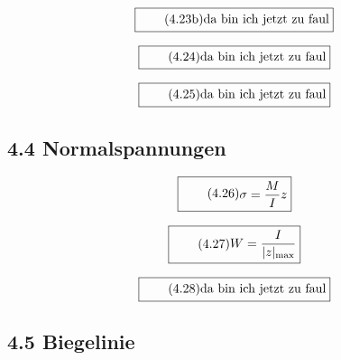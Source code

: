 \documentclass[11pt]{article}
\newcommand{\1}{ {\mathds{1}} }
\newcommand{\abs}[1]{\lvert#1\rvert}
\begin{document}
    \begin{equation}
      \boxed{
        \tag{4.23b}
        \begin{split}
          \text{da bin ich jetzt zu faul}
        \end{split}
      }
    \end{equation}

    \begin{equation}
      \boxed{
        \tag{4.24}
        \begin{split}
          \text{da bin ich jetzt zu faul}
        \end{split}
      }
    \end{equation}

    \begin{equation}
      \boxed{
        \tag{4.25}
        \begin{split}
          \text{da bin ich jetzt zu faul}
        \end{split}
      }
    \end{equation}
    
    \subsection*{4.4 Normalspannungen}

    \begin{equation}
      \boxed{
        \tag{4.26}
        \begin{split}
          \sigma
          =
          \frac{M}{I}
          z
        \end{split}
      }
    \end{equation}
    
    \begin{equation}
      \boxed{
        \tag{4.27}
        \begin{split}
          W
          =
          \frac{I}{\abs{z}_{\text{max}}}
        \end{split}
      }
    \end{equation}

    \begin{equation}
      \boxed{
        \tag{4.28}
        \begin{split}
          \text{da bin ich jetzt zu faul}
        \end{split}
      }
    \end{equation}
    
    \subsection*{4.5 Biegelinie}
\end{document}
